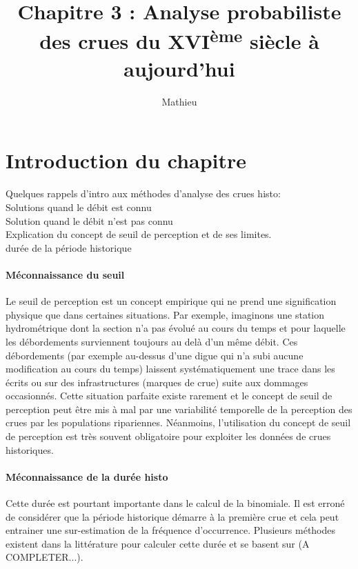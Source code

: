 \documentclass[11pt]{article}
\title{Chapitre 3 : Analyse probabiliste des crues du XVI\textsuperscript{ème} siècle à aujourd'hui}
\author{Mathieu}
\begin{document}
\maketitle

\tableofcontents

\section{Introduction du chapitre}
	Quelques rappels d'intro aux méthodes d'analyse des crues histo:
	\cite{stedinger_flood_1986}\\
	Solutions quand le débit est connu\\
	Solution quand le débit n'est pas connu	\\
	Explication du concept de seuil de perception et de ses limites.\\
	durée de la période historique\\
	
	\paragraph{Méconnaissance du seuil}
	Le seuil de perception est un concept empirique qui ne prend une signification physique que dans certaines situations. Par exemple, imaginons une station hydrométrique dont la section n'a pas évolué au cours du temps et pour laquelle les débordements surviennent toujours au delà d'un même débit. Ces débordements (par exemple au-dessus d'une digue qui n'a subi aucune modification au cours du temps) laissent systématiquement une trace dans les écrits ou sur des infrastructures (marques de crue) suite aux dommages occasionnés. Cette situation parfaite existe rarement et le concept de seuil de perception peut être mis à mal par une variabilité temporelle de la perception des crues par les populations ripariennes. Néanmoins, l'utilisation du concept de seuil de perception est très souvent obligatoire pour exploiter les données de crues historiques. 
	
	\paragraph{Méconnaissance de la durée histo}Cette durée est pourtant importante dans le calcul de la binomiale. Il est erroné de considérer que la période historique démarre à la première crue et cela peut entrainer une sur-estimation de la fréquence d'occurrence. Plusieurs méthodes existent dans la littérature pour calculer cette durée et se basent sur (A COMPLETER...). 
		
\end{document}
